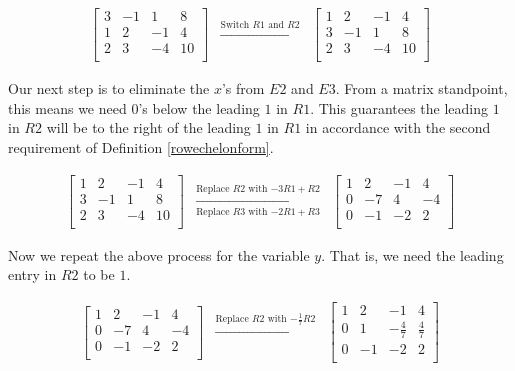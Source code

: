 \begin{ex}
\[\begin{array}{ccc}
\left[ \begin{array}{rrr|r} 
3 & -1 & 1 & 8 \\ 
1 & 2 & -1 & 4 \\ 
2 & 3 & -4 & 10 \\ 
\end{array} \right]

& 

\xrightarrow{\text{Switch $R1$ and $R2$}}

&

\left[ \begin{array}{rrr|r}
1 & 2 & -1 & 4 \\  
3 & -1 & 1 & 8 \\ 
2 & 3 & -4 & 10 \\ 
\end{array} \right]


\end{array}\]



Our next step is to eliminate the $x$'s from $E2$ and $E3$.  From a matrix standpoint, this means we need $0$'s below the leading $1$ in $R1$.  This guarantees the leading $1$ in $R2$ will be to the right of the leading $1$ in $R1$ in accordance with the second requirement of Definition \ref{rowechelonform}.

\[\begin{array}{ccc}

\left[ \begin{array}{rrr|r}
1 & 2 & -1 & 4 \\  
3 & -1 & 1 & 8 \\ 
2 & 3 & -4 & 10 \\ 
\end{array} \right]
&
\xrightarrow[\text{Replace $R3$ with $-2R1+R3$}]{\text{Replace $R2$ with $-3R1 +R2$}} 
&
\left[ \begin{array}{rrr|r}  
1 & 2 & -1 & 4 \\  
0 & -7 & 4 & -4 \\ 
0 & -1 & -2  & 2 \\ 
\end{array} \right]



\end{array}\]

Now we repeat the above process for the variable $y$.  That is, we need the leading entry in $R2$ to be $1$.

\[\begin{array}{ccc}

\left[ \begin{array}{rrr|r}  
1 & 2 & -1 & 4 \\  
0 & -7 & 4 & -4 \\ 
0 & -1 & -2  & 2 \\ 
\end{array} \right]  
& 
\xrightarrow{\text{Replace $R2$ with $-\frac{1}{7}R2$}}  
& 
\left[ \begin{array}{rrr|r} 
1 & 2 & -1 & 4 \\ 
0 & 1 & -\frac{4}{7} & \frac{4}{7} \\ 
0 & -1 & -2 & 2 \\
\end{array} \right]


\end{array}\]
\end{ex}
